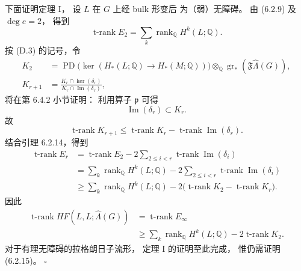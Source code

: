 下面证明定理 I，
设 $L$ 在 $G$ 上经 bulk 形变后
为（弱）无障碍。
由 (6.2.9) 及 $\deg e=2$，
得到
\[
\operatorname{t-rank}E_2
=\sum_k\operatorname{rank}_{\mathbb Q}
H^k(L;\mathbb Q).
\]
按 (D.3) 的记号，令
\[
\begin{aligned}
K_2
&=\operatorname{PD}
\bigl(\ker(H_*(L;\mathbb Q)
\longrightarrow H_*(M;\mathbb Q))\bigr)
\otimes_{\mathbb Q}
\operatorname{gr}_*
(\mathfrak F\widehat\Lambda(G)),\\
K_{r+1}
&=\frac{K_r\cap\ker(\delta_r)}
{K_r\cap\operatorname{Im}(\delta_r)},
\end{aligned}
\]
将在第 6.4.2 小节证明：
利用算子 $\mathfrak p$ 可得
\begin{equation}
\operatorname{Im}(\delta_r)\subset K_r.
\tag{6.2.15}\label{eq:6-2-15}
\end{equation}
故
\[
\operatorname{t-rank}K_{r+1}
\le\operatorname{t-rank}K_r
-\operatorname{t-rank}
\operatorname{Im}(\delta_r).
\]
结合引理 6.2.14，得到
\[
\begin{aligned}
\operatorname{t-rank}E_r
&=\operatorname{t-rank}E_2
-2\sum_{2\le i<r}
\operatorname{t-rank}
\operatorname{Im}(\delta_i)\\
&=\sum_k\operatorname{rank}_{\mathbb Q}
H^k(L;\mathbb Q)
-2\sum_{2\le i<r}
\operatorname{t-rank}
\operatorname{Im}(\delta_i)\\
&\ge\sum_k\operatorname{rank}_{\mathbb Q}
H^k(L;\mathbb Q)
-2\bigl(\operatorname{t-rank}K_2
-\operatorname{t-rank}K_r\bigr).
\end{aligned}
\]
因此
\[
\begin{aligned}
\operatorname{t-rank}
HF(L,L;\widehat\Lambda(G))
&=\operatorname{t-rank}E_\infty\\
&\ge\sum_k\operatorname{rank}_{\mathbb Q}
H^k(L;\mathbb Q)
-2\operatorname{t-rank}K_2.
\end{aligned}
\]
对于有理无障碍的拉格朗日子流形，
定理 I 的证明至此完成，
惟仍需证明 (6.2.15)。
\hfill$\square$
